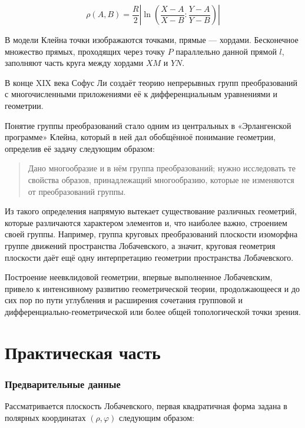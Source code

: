 \documentclass{article}
\numberwithin{equation}{section}
\renewcommand{\phi}{\varphi}
\providecommand{\abs}[1]{\left \lvert{#1}\right \rvert}
\begin{document}
\begin{equation}\label{eq:projective-metric}
  \rho(A, B) = \frac{R}{2} \abs{\ln{\left (
        \frac{X-A}{X-B}:\frac{Y-A}{Y-B} \right )}}
\end{equation}

В модели Клейна точки изображаются точками, прямые — хордами.
Бесконечное множество прямых, проходящих через точку $P$ параллельно
данной прямой $l$, заполняют часть круга между хордами $XM$ и $YN$.



В конце XIX века Софус Ли создаёт теорию непрерывных групп
преобразований с многочисленными приложениями её к дифференциальным
уравнениями и геометрии.

Понятие группы преобразований стало одним из центральных в
«Эрлангенской программе» Клейна, который в ней дал обобщённоё
понимание геометрии, определив её задачу следующим образом:

\begin{quote}
  Дано многообразие и в нём группа преобразований; нужно исследовать
  те свойства образов, принадлежащий многообразию, которые не
  изменяются от преобразований группы.
\end{quote}

Из такого определения напрямую вытекает существование различных
геометрий, которые различаются характером элементов и, что наиболее
важно, строением своей группы. Например, группа круговых
преобразований плоскости изоморфна группе движений пространства
Лобачевского, а значит, круговая геометрия плоскости даёт ещё одну
интерпретацию геометрии пространства Лобачевского.

Построение неевклидовой геометрии, впервые выполненное Лобачевским,
привело к интенсивному развитию геометрической теории, продолжающееся
и до сих пор по пути углубления и расширения сочетания групповой и
дифференциально-геометрической или более общей топологической точки
зрения.

\clearpage
\part{Практическая часть}

\section{Предварительные данные}
Рассматривается плоскость Лобачевского, первая квадратичная форма
задана в полярных координатах $(\rho, \phi)$ следующим образом:
\end{document}

